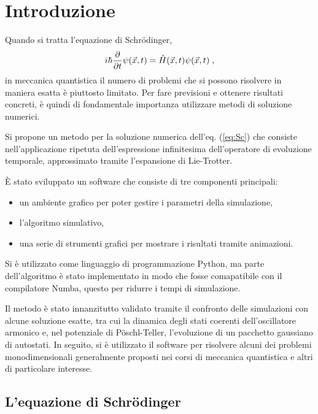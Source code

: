 \chapter*{Introduzione}
\label{ch:introduzione}

Quando si tratta l'equazione di Schr\"odinger, 
\begin{equation}
    \centering
    i \hbar \frac{\partial}{\partial t} \psi (\vec{x}, t) = \hat{H} (\vec{x}, t) \psi (\vec{x}, t) \; \text{,}
    \label{eq:Sc}
\end{equation}
in meccanica quantistica il numero di problemi che si possono risolvere in maniera esatta è piuttosto limitato. Per fare previsioni e ottenere risultati concreti, è quindi di fondamentale importanza utilizzare metodi di soluzione numerici.

Si propone un metodo per la soluzione numerica dell'eq. (\ref{eq:Sc}) che consiste nell'applicazione ripetuta dell'espressione infinitesima dell'operatore di evoluzione temporale, approssimato tramite l'espansione di  Lie-Trotter.

È stato sviluppato un software che consiste di tre componenti principali: 
\begin{itemize} [nolistsep, leftmargin=1.5cm]
    \item un ambiente grafico per poter gestire i parametri della simulazione,
    \item l'algoritmo simulativo,
    \item una serie di strumenti grafici per mostrare i risultati tramite animazioni.
\end{itemize}
Si è utilizzato come linguaggio di programmazione Python, ma parte dell'algoritmo è stato implementato in modo che fosse comapatibile con il compilatore Numba, questo per ridurre i tempi di simulazione. 

Il metodo è stato innanzitutto validato tramite il confronto delle simulazioni con alcune soluzione esatte, tra cui la dinamica degli stati coerenti dell'oscillatore armonico e, nel potenziale di P\"oschl-Teller, l'evoluzione di un pacchetto gaussiano di autostati. In seguito, si è utilizzato il software per risolvere alcuni dei problemi monodimensionali generalmente proposti nei corsi di meccanica quantistica e altri di particolare interesse.

\section{L'equazione di Schr\"odinger}
\label{sec:idea}

